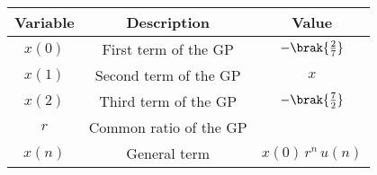 \begin{tabular}[12.1pt]{ |c| c| c|}
    \hline
    \textbf{Variable} & \textbf{Description} &\textbf{Value}\\ 
    \hline
    $x(0)$ & First term of the GP &$-\brak{\frac{2}{7}}$ \\
    \hline 
    $x(1)$ & Second term of the GP &$x$ \\
    \hline 
    $x(2)$ & Third term of the GP &$-\brak{\frac{7}{2}}$ \\
    \hline 
    $r$ & Common ratio of the GP &  \\
    \hline
    $x(n)$ & General term & $x(0)\,r^n\,u(n)$\\
    \hline    
\end{tabular}
